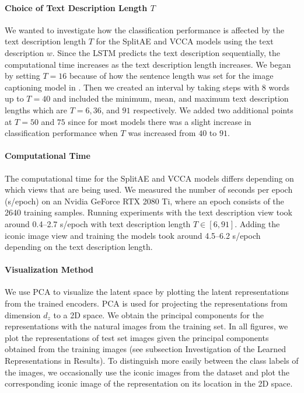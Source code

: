 \paragraph{Choice of Text Description Length $T$} We wanted to investigate how the classification performance is affected by the text description length $T$ for the SplitAE and VCCA models using the text description $w$. Since the LSTM predicts the text description sequentially, the computational time increases as the text description length increases. We began by setting $T = 16$ because of how the sentence length was set for the image captioning model in \cite{lu2018neural}. Then we created an interval by taking steps with 8 words up to $T=40$ and included the minimum, mean, and maximum text description lengths which are $T=6, 36$, and $91$ respectively. We added two additional points at $T=50$ and $75$ since for most models there was a slight increase in classification performance when $T$ was increased from $40$ to $91$. 

\paragraph{Computational Time} The computational time for the SplitAE and VCCA models differs depending on which views that are being used. We measured the number of seconds per epoch (s/epoch) on an Nvidia GeForce RTX 2080 Ti, where an epoch consists of the 2640 training samples. Running experiments with the text description view 
took around 0.4--2.7 s/epoch with text description length $T \in [6, 91]$. Adding the iconic image view and training the models 
took around 4.5--6.2 s/epoch depending on the text description length.


\paragraph{Visualization Method} We use PCA to visualize the latent space by plotting the latent representations from the trained encoders. PCA is used for projecting the representations from dimension $d_{z}$ to a 2D space. We obtain the principal components for the representations with the natural images from the training set. In all figures, we plot the representations of test set images given the principal components obtained from the training images (see subsection Investigation of the Learned Representations in Results). To distinguish more easily between the class labels of the images, we occasionally use the iconic images from the dataset and plot the corresponding iconic image of the representation on its location in the 2D space.

